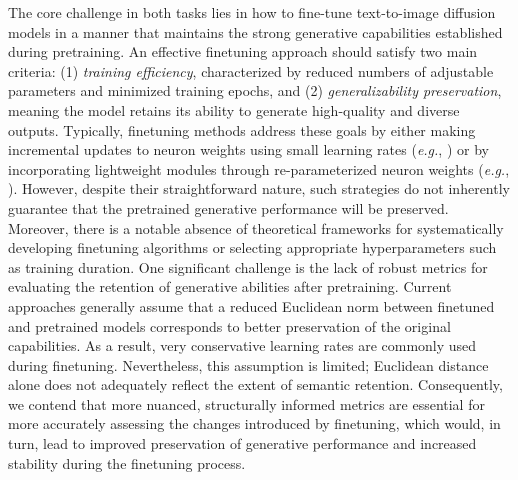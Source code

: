 The core challenge in both tasks lies in how to fine-tune text-to-image diffusion models in a manner that maintains the strong generative capabilities established during pretraining. An effective finetuning approach should satisfy two main criteria: (1) \emph{training efficiency}, characterized by reduced numbers of adjustable parameters and minimized training epochs, and (2) \emph{generalizability preservation}, meaning the model retains its ability to generate high-quality and diverse outputs. Typically, finetuning methods address these goals by either making incremental updates to neuron weights using small learning rates (\emph{e.g.}, \cite{ruiz2023dreambooth}) or by incorporating lightweight modules through re-parameterized neuron weights (\emph{e.g.}, \cite{hulora2022,zhang2023adding}). However, despite their straightforward nature, such strategies do not inherently guarantee that the pretrained generative performance will be preserved. Moreover, there is a notable absence of theoretical frameworks for systematically developing finetuning algorithms or selecting appropriate hyperparameters such as training duration. One significant challenge is the lack of robust metrics for evaluating the retention of generative abilities after pretraining. Current approaches generally assume that a reduced Euclidean norm between finetuned and pretrained models corresponds to better preservation of the original capabilities. As a result, very conservative learning rates are commonly used during finetuning. Nevertheless, this assumption is limited; Euclidean distance alone does not adequately reflect the extent of semantic retention. Consequently, we contend that more nuanced, structurally informed metrics are essential for more accurately assessing the changes introduced by finetuning, which would, in turn, lead to improved preservation of generative performance and increased stability during the finetuning process.

